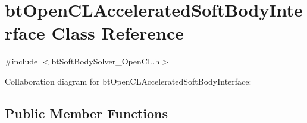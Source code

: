 \hypertarget{classbt_open_c_l_accelerated_soft_body_interface}{\section{bt\+Open\+C\+L\+Accelerated\+Soft\+Body\+Interface Class Reference}
\label{classbt_open_c_l_accelerated_soft_body_interface}
}


{\ttfamily \#include $<$bt\+Soft\+Body\+Solver\+\_\+\+Open\+C\+L.\+h$>$}



Collaboration diagram for bt\+Open\+C\+L\+Accelerated\+Soft\+Body\+Interface\+:
\subsection*{Public Member Functions}

